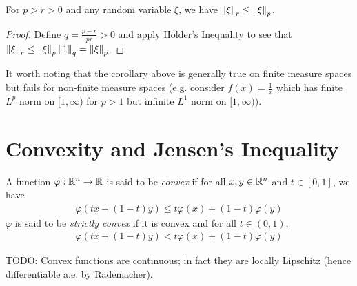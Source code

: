 \begin{cor}\label{IncreasingMoments}For $p > r > 0$ and any random variable $\xi$, we
  have $\left \lVert \xi \right \rVert_r \leq \left \lVert \xi \right \rVert_p$.
\end{cor}
\begin{proof}Define $q = \frac{p -r}{pr} > 0$ and apply H\"older's
  Inequality to see that $\left \lVert \xi \right \rVert_r \leq \left \lVert \xi \right \rVert_p \left \lVert 1 \right \rVert_q = \left \lVert \xi \right \rVert_p $.
\end{proof}
It worth noting that the corollary above is generally true on finite
measure spaces but fails for non-finite measure spaces (e.g. consider
$f(x) = \frac{1}{x}$ which has finite $L^p$ norm on $[1,\infty)$ for
$p > 1$ but infinite $L^1$ norm on $[1,\infty)$).

\section{Convexity and Jensen's Inequality}
\begin{defn}A function $\varphi : \mathbb{R}^n \to \mathbb{R}$ is said to be
  \emph{convex} if for all $x, y \in \mathbb{R}^n$ and $t \in [0,1]$, we
  have
\begin{align*}
\varphi( tx + (1-t)y) \leq t\varphi(x) + (1-t)\varphi(y)
\end{align*}
$\varphi$ is said to be \emph{strictly convex} if it is convex and for
all $t \in (0,1)$, 
\begin{align*}
\varphi( tx + (1-t)y) < t\varphi(x) + (1-t)\varphi(y)
\end{align*}
\end{defn}

TODO: Convex functions are continuous; in fact they are locally Lipschitz (hence differentiable a.e. by Rademacher).

